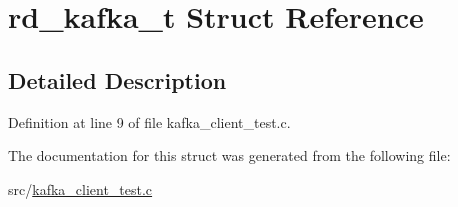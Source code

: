 \hypertarget{structrd__kafka__t}{\section{rd\-\_\-kafka\-\_\-t \-Struct \-Reference}
\label{structrd__kafka__t}
}


\subsection{\-Detailed \-Description}


\-Definition at line 9 of file kafka\-\_\-client\-\_\-test.\-c.



\-The documentation for this struct was generated from the following file\-:\begin{DoxyCompactItemize}
\item 
src/\hyperlink{kafka__client__test_8c}{kafka\-\_\-client\-\_\-test.\-c}\end{DoxyCompactItemize}
